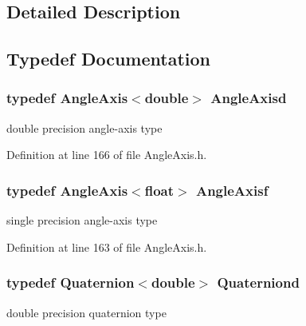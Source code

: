 \subsection{Detailed Description}


\subsection{Typedef Documentation}
\hypertarget{group___geometry___module_ga0db1cc067c51aaa6dedf5805ee0c53d7}{
\subsubsection[{Angle\-Axisd}]{\setlength{\rightskip}{0pt plus 5cm}typedef {\bf Angle\-Axis}$<${\bf double}$>$ {\bf Angle\-Axisd}}}\label{group___geometry___module_ga0db1cc067c51aaa6dedf5805ee0c53d7}
double precision angle-\/axis type 

Definition at line 166 of file Angle\-Axis.\-h.

\hypertarget{group___geometry___module_ga811d6fdab2002723bc7a72f055ce8c1d}{
\subsubsection[{Angle\-Axisf}]{\setlength{\rightskip}{0pt plus 5cm}typedef {\bf Angle\-Axis}$<${\bf float}$>$ {\bf Angle\-Axisf}}}\label{group___geometry___module_ga811d6fdab2002723bc7a72f055ce8c1d}
single precision angle-\/axis type 

Definition at line 163 of file Angle\-Axis.\-h.

\hypertarget{group___geometry___module_ga0d2bd45f1215359f8e7c0d7ab53c4acb}{
\subsubsection[{Quaterniond}]{\setlength{\rightskip}{0pt plus 5cm}typedef {\bf Quaternion}$<${\bf double}$>$ {\bf Quaterniond}}}\label{group___geometry___module_ga0d2bd45f1215359f8e7c0d7ab53c4acb}
double precision quaternion type 


